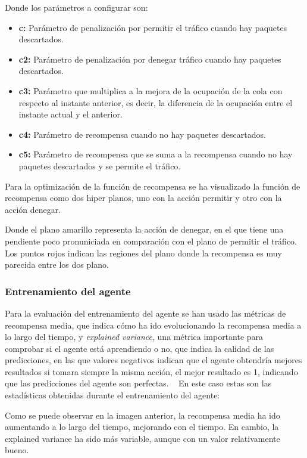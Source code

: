 Donde los parámetros a configurar son:
\begin{itemize}
    \item \textbf{c:} Parámetro de penalización por permitir el tráfico cuando hay paquetes descartados.
    \item \textbf{c2:} Parámetro de penalización por denegar tráfico cuando hay paquetes descartados.
    \item \textbf{c3:} Parámetro que multiplica a la mejora de la ocupación de la cola con respecto al instante anterior, es decir, la diferencia de la ocupación entre el instante actual y el anterior.
    \item \textbf{c4:} Parámetro de recompensa cuando no hay paquetes descartados.
    \item \textbf{c5:} Parámetro de recompensa que se suma a la recompensa cuando no hay paquetes descartados y se permite el tráfico.
\end{itemize}

Para la optimización de la función de recompensa se ha visualizado la función de recompensa como dos hiper planos, uno con la acción permitir y otro con la acción denegar. 

Donde el plano amarillo representa la acción de denegar, en el que tiene una pendiente poco pronuniciada en comparación con el plano de permitir el tráfico.
Los puntos rojos indican las regiones del plano donde la recompensa es muy parecida entre los dos plano.

\subsubsection{Entrenamiento del agente}
Para la evaluación del entrenamiento del agente se han usado las métricas de recompensa media, que indica cómo ha ido evolucionando la recompensa media a lo largo del tiempo, y \textit{explained variance}, una métrica importante para comprobar si el agente está aprendiendo o no, que indica la calidad de las predicciones, en las que valores negativos indican que el agente obtendría mejores resultados si tomara siempre la misma acción, el mejor resultado es 1, indicando que las predicciones del agente son perfectas. ~\cite{JonathanHui2023}
En este caso estas son las estadísticas obtenidas durante el entrenamiento del agente:


Como se puede observar en la imagen anterior, la recompensa media ha ido aumentando a lo largo del tiempo, mejorando con el tiempo. En cambio, la explained variance ha sido más variable, aunque con un valor relativamente bueno.


